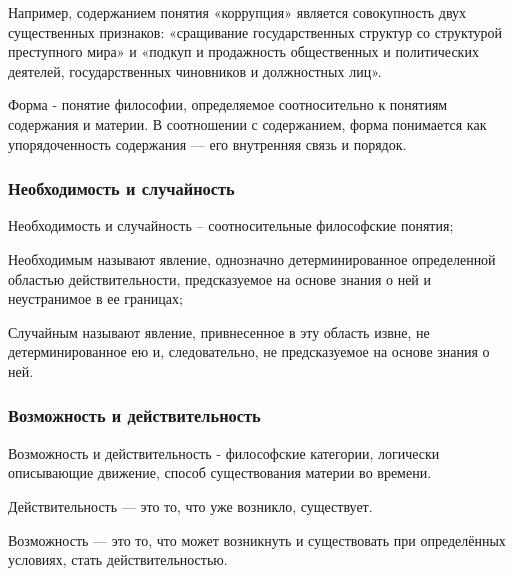 \documentclass{article}
\begin{document}
Например, содержанием понятия «коррупция» является совокупность двух существенных признаков: «сращивание государственных структур со структурой преступного мира» и «подкуп и продажность общественных и политических деятелей, государственных чиновников и должностных лиц».

Форма - понятие философии, определяемое соотносительно к понятиям содержания и материи. В соотношении с содержанием, форма понимается как упорядоченность содержания — его внутренняя связь и порядок.

\subsubsection{Необходимость и случайность}

Необходимость и случайность – соотносительные философские понятия;

Необходимым называют явление, однозначно детерминированное определенной областью действительности, предсказуемое на основе знания о ней и неустранимое в ее границах;

Случайным называют явление, привнесенное в эту область извне, не детерминированное ею и, следовательно, не предсказуемое на основе знания о ней.

\subsubsection{Возможность и действительность}

Возможность и действительность - философские категории, логически описывающие движение, способ существования материи во времени.

Действительность — это то, что уже возникло, существует.

Возможность — это то, что может возникнуть и существовать при определённых условиях, стать действительностью.
\end{document}
